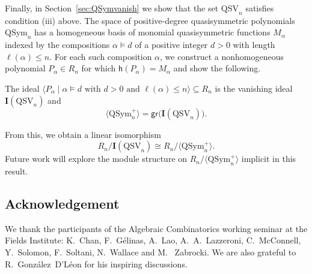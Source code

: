 \documentclass[12pt]{amsart}
\theoremstyle{definition}
\theoremstyle{remark}
\numberwithin{equation}{section}
\newenvironment{introthm}[1]{
  \renewcommand\theequation{#1}
  \thm
}{\endthm}
\newcommand{\QSym}{\mathrm{QSym}}
\newcommand{\QSV}{\mathrm{QSV}}
\begin{document}
Finally, in Section~\ref{sec:QSymvanish} we show that the set $\QSV_{n}$ satisfies condition (iii) above.  
The space of positive-degree quasisymmetric polynomials $\QSym_{n}$ has a homogeneous basis of monomial quasisymmetric functions $M_{\alpha}$ indexed by the compositions $\alpha \vDash d$ of a positive integer $d > 0$ with length $\ell(\alpha) \le n$.  
For each such composition $\alpha$, we construct a nonhomogeneous polynomial $P_{\alpha} \in R_{n}$ for which $\mathsf{h}(P_{\alpha}) = M_{\alpha}$ and show the following.

\begin{introthm}{\ref{thm:vanishingQSV}}
The ideal $\langle P_{\alpha} \;|\; \text{$\alpha \vDash d $ with $d> 0$ and $\ell(\alpha) \le n$} \rangle \subseteq R_n$ is the vanishing ideal $\mathbf{I}(\QSV_n)$ and 
\[
 \langle \QSym_{n}^{+} \rangle = \mathsf{gr}\big(\mathbf{I}(\QSV_{n})\big).
\]
\end{introthm}

From this, we obtain a linear isomorphism
\[
R_{n}\big/\mathbf{I}(\QSV_{n}) \cong R_{n}\big/\langle \QSym_{n}^{+} \rangle.
\]
Future work will explore the module structure on $R_{n}\big/\langle \QSym_{n}^{+} \rangle$ implicit in this result.

\subsection{Acknowledgement} 
We thank the participants of the Algebraic Combinatorics working seminar at the Fields Institute: K.~Chan, F.~G\'elinas, A.~Lao, A.~A.~Lazzeroni, C.~McConnell, Y.~Solomon, F.~Soltani,  N.~Wallace and 
M.~ Zabrocki.
We are also grateful to R.~Gonz\'alez~D'L\'eon for his  inspiring discussions.%
\end{document}
